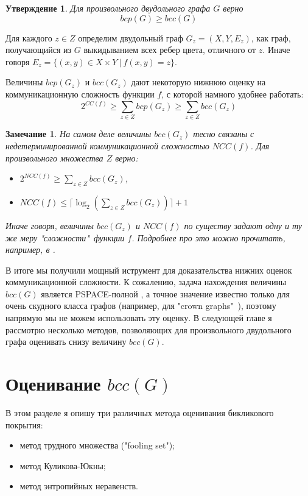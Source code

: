 \documentclass[a4paper]{article}
\newtheorem*{mremark}{Замечание}
\newtheorem{mclaim}{Утверждение}[section]
\begin{document}
\begin{mclaim}
    Для произвольного двудольного графа $G$ верно $$bcp(G) \geq bcc(G)$$
\end{mclaim}

Для каждого $z \in Z$ определим двудольный граф $G_z = (X, Y, E_z)$, как граф, получающийся из $G$ 
выкидыванием всех ребер цвета, отличного от $z$. Иначе говоря $E_z = \{(x,y)\in X\times Y\ |\ f(x, y) = z \}$.

Величины $bcp(G_z)$ и $bcc(G_z)$ дают некоторую нижнюю оценку на коммуникационную сложность функции $f$, 
с которой намного удобнее работать: $$2^{CC(f)}\geq \sum\limits_{z\in Z}bcp(G_z)\geq \sum\limits_{z\in Z}bcc(G_z)$$

\begin{mremark}
    На самом деле величины $bcc(G_z)$ тесно связаны с недетерминированной коммуникационной сложностью 
    $NCC(f)$. Для произвольного множества $Z$ верно:
    \begin{itemize}[noitemsep]
        \item $2^{NCC(f)}\geq \sum\limits_{z\in Z}bcc(G_z)$,
        \item $NCC(f) \leq \lceil \log_2(\sum\limits_{z\in Z}bcc(G_z))\rceil + 1$
    \end{itemize}
    Иначе говоря, величины $bcc(G_z)$ и $NCC(f)$ по существу задают одну и ту же меру "сложности"\ функции $f$. 
    Подробнее про это можно прочитать, например, в \cite{Razborov}.
\end{mremark}

В итоге мы получили мощный иструмент для доказательства нижних оценок коммуникационной сложности. 
К сожалению, задача нахождения величины $bcc(G)$ является PSPACE-полной \cite{HermannMarkus}, а точное 
значение известно только для очень скудного класса графов (например, для "crown graphs"\ \cite{CrownGraph}), поэтому 
напрямую мы не можем использовать эту оценку. В следующей главе я рассмотрю несколько методов, 
позволяющих для произвольного двудольного графа оценивать снизу величину $bcc(G)$.

\setcounter{mclaim}{0}
\setcounter{mlemma}{0}
\setcounter{mtheorem}{0}
\addtocounter{section}{1}
\section*{Оценивание $bcc(G)$}

В этом разделе я опишу три различных метода оценивания бикликового покрытия:
\begin{itemize}[noitemsep]
	\item метод трудного множества ("fooling set");
	\item метод Куликова-Юкны;
	\item метод энтропийных неравенств.
\end{itemize}
\end{document}
